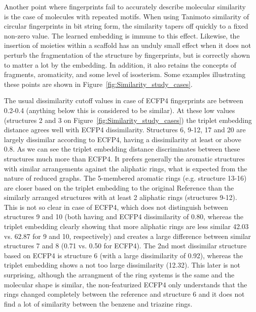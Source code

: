 \documentclass[doublespacing]{bmcart}
\begin{document}
Another point where fingerprints fail to accurately describe molecular similarity is the case of molecules with repeated motifs. When using Tanimoto similarity of circular fingerprints in bit string form, the similarity tapers off quickly to a fixed non-zero value. The learned embedding is immune to this effect. Likewise, the insertion of moieties within a scaffold has an unduly small effect when it does not perturb the fragmentation of the structure by fingerprints, but is correctly shown to matter a lot by the embedding. In addition, it also retains the concepts of fragments, aromaticity, and some level of isosterism. Some examples illustrating these points are shown in Figure~\ref{fig:Similarity_study_cases}.

The usual dissimilarity cutoff values in case of ECFP4 fingerprints are between 0.2-0.4 (anything below this is considered to be similar). At these low values (structures 2 and 3 on Figure~\ref{fig:Similarity_study_cases}) the triplet embedding distance agrees well with ECFP4 dissimilarity.  Structures 6, 9-12, 17 and 20 are largely dissimilar according to ECFP4, having a dissimilarity at least or above 0.8. As we can see the triplet embedding distance discriminates between these structures much more than ECFP4. It prefers generally the aromatic structures with similar arrangements against the aliphatic rings, what is expected from the nature of reduced graphs. The 5-membered aromatic rings (e.g. structure 13-16) are closer based on the triplet embedding to the original Reference than the similarly arranged structures with at least 2 aliphatic rings (structures 9-12). This is not so clear in case of ECFP4, which does not distinguish between structures 9 and 10 (both having and ECFP4 dissimilarity of 0.80, whereas the triplet embedding clearly showing that more aliphatic rings are less similar 42.03 vs. 62.87 for 9 and 10, respectively) and creates a large difference between similar structures 7 and 8 (0.71 vs. 0.50 for ECFP4). The 2nd most dissimilar structure based on ECFP4 is structure 6 (with a large dissimilarity of 0.92), whereas the triplet embedding shows a not too large dissimilarity (12.32). This later is not surprising, although the arrangment of the ring systems is the same and the molecular shape is similar, the non-featurized ECFP4 only understands that the rings changed completely between the reference and structure 6 and it does not find a lot of similarity between the benzene and triazine rings.
\end{document}
